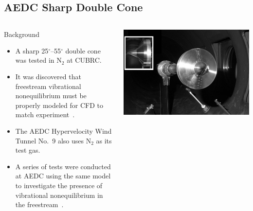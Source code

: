 \documentclass[compress,11pt]{beamer}
\begin{document}

\subsection{AEDC Sharp Double Cone}
\frame
{
  \begin{columns}[t]
    \vspace{-1em}
    \begin{block}{Background}
      \footnotesize
      \begin{itemize}
        \item A sharp 25$^\circ$--55$^\circ$ double cone was tested in N$_2$ at CUBRC.
	\item It was discovered that freestream vibrational nonequilibrium must be properly modeled for CFD to match experiment~\cite{nompelis_candler_holden_double_cone}.
	\item The AEDC Hypervelocity Wind Tunnel No.~9 also uses N$_2$ as its test gas.
	\item A series of tests were conducted at AEDC using the same model to investigate the presence of vibrational nonequilibrium in the freestream~\cite{AEDC_HVWT9_double_cone}.
      \end{itemize}
    \end{block}
    
    \vspace{2em}
    
    \includegraphics[width=\textwidth]{figures/aedc_double_cone/double_cone_HVWT9}
  \end{columns}
}
\end{document}
